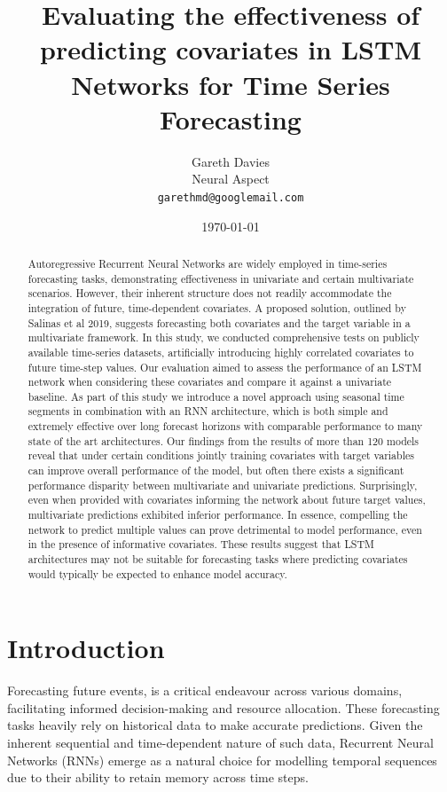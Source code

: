 \documentclass{article}
\title{Evaluating the effectiveness of predicting covariates in LSTM Networks for Time Series Forecasting}
\author{Gareth Davies\\
Neural Aspect \\
\texttt{garethmd@googlemail.com} }
\date{\today}
\begin{document}
\maketitle

\begin{abstract}
Autoregressive Recurrent Neural Networks are widely employed in time-series forecasting tasks,
demonstrating effectiveness in univariate and certain multivariate scenarios. However, their inherent structure
does not readily accommodate the integration of future, time-dependent covariates. A proposed solution, outlined by
Salinas et al 2019\cite{salinas2019deepar}, suggests forecasting both covariates and the target variable
in a multivariate framework. In this study, we conducted comprehensive tests on publicly available time-series datasets, artificially
introducing highly correlated covariates to future time-step values. Our evaluation aimed to assess the
performance of an LSTM network when considering these covariates and compare it against a univariate baseline. As part of this study we
introduce a novel approach using seasonal time segments in combination with an RNN architecture, which is
both simple and extremely effective over long forecast horizons with comparable performance
to many state of the art architectures. Our findings from the results of more than 120 models reveal that under certain conditions
jointly training covariates with target variables can improve overall performance of the model, but often there exists a significant performance
disparity between multivariate and univariate predictions. Surprisingly, even when provided with covariates informing the
network about future target values, multivariate predictions exhibited inferior performance.
In essence, compelling the network to predict multiple values can prove detrimental to model performance, even in the presence of informative covariates.
These results suggest that LSTM architectures may not be suitable for forecasting tasks where predicting covariates
would typically be expected to enhance model accuracy.
\end{abstract}

\section{Introduction}
Forecasting future events, is a critical endeavour across various domains, facilitating informed decision-making
and resource allocation. These forecasting tasks heavily rely on historical data to make accurate predictions. Given the inherent 
sequential and time-dependent nature of such data, Recurrent Neural Networks (RNNs) emerge as a natural choice for modelling temporal sequences 
due to their ability to retain memory across time steps.\cite{elman1990}
\end{document}
